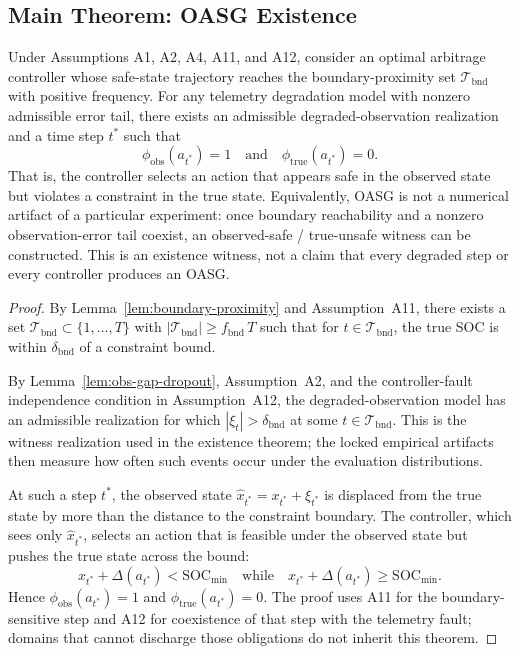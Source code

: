\subsection{Main Theorem: OASG Existence}

\begin{theorem}
\label{thm:oasg-existence}
Under Assumptions A1, A2, A4, A11, and A12, consider an optimal arbitrage
controller whose safe-state trajectory reaches the boundary-proximity set
$\mathcal{T}_{\mathrm{bnd}}$ with positive frequency.  For any telemetry
degradation model with nonzero admissible error tail, there exists an
admissible degraded-observation realization and a time step $t^*$ such that
\[
  \phi_{\text{obs}}(a_{t^*}) = 1 \quad\text{and}\quad
  \phi_{\text{true}}(a_{t^*}) = 0.
\]
That is, the controller selects an action that appears safe in the
observed state but violates a constraint in the true state.  Equivalently,
OASG is not a numerical artifact of a particular experiment: once boundary
reachability and a nonzero observation-error tail coexist, an observed-safe /
true-unsafe witness can be constructed.  This is an existence witness, not a
claim that every degraded step or every controller produces an OASG.
\end{theorem}

\begin{proof}
By Lemma~\ref{lem:boundary-proximity} and Assumption~A11, there exists a set
$\mathcal{T}_{\text{bnd}} \subset \{1, \ldots, T\}$ with
$|\mathcal{T}_{\text{bnd}}| \ge f_{\text{bnd}}\,T$ such that for
$t \in \mathcal{T}_{\text{bnd}}$, the true SOC is within
$\delta_{\text{bnd}}$ of a constraint bound.

By Lemma~\ref{lem:obs-gap-dropout}, Assumption~A2, and the controller-fault
independence condition in Assumption~A12, the degraded-observation model has an
admissible realization for which $|\xi_t| > \delta_{\text{bnd}}$ at some
$t \in \mathcal{T}_{\text{bnd}}$.  This is the witness realization used in the
existence theorem; the locked empirical artifacts then measure how often such
events occur under the evaluation distributions.

At such a step $t^*$, the observed state $\hat{x}_{t^*} = x_{t^*} + \xi_{t^*}$
is displaced from the true state by more than the distance to the
constraint boundary.  The controller, which sees only $\hat{x}_{t^*}$,
selects an action that is feasible under the observed state but pushes
the true state across the bound:
\[
  x_{t^*} + \Delta(a_{t^*}) < \text{SOC}_{\min}
  \quad\text{while}\quad
  \hat{x}_{t^*} + \Delta(a_{t^*}) \ge \text{SOC}_{\min}.
\]
Hence $\phi_{\text{obs}}(a_{t^*}) = 1$ and $\phi_{\text{true}}(a_{t^*}) = 0$.
The proof uses A11 for the boundary-sensitive step and A12 for coexistence of
that step with the telemetry fault; domains that cannot discharge those
obligations do not inherit this theorem.
\end{proof}

